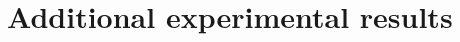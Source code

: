 \documentclass{article}
\theoremstyle{plain}
\theoremstyle{definition}
\theoremstyle{remark}
\newcommand{\secref}[1]{Section~\ref{sec:#1}}
\begin{document}

\section{Additional experimental results} \label{app:additionalresults}


\end{document}
